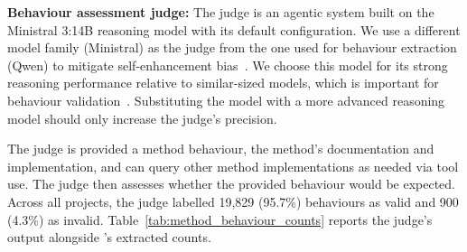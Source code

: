 

\smallskip
\noindent\textbf{Behaviour assessment judge:} The judge is an agentic system built on the Ministral 3:14B reasoning model with its default configuration. We use a different model family (Ministral) as the judge from the one used for behaviour extraction (Qwen) to mitigate self-enhancement bias~\cite{zheng2023judging}.
We choose this model for its strong reasoning performance relative to similar-sized models, which is important for behaviour validation~\cite{liu2026ministral}. 
Substituting the model with a more advanced reasoning model should only increase the judge's precision. 

The judge is provided a method behaviour, the method's documentation and implementation, and can query other method implementations as needed via tool use. 
The judge then assesses whether the provided behaviour would be expected. 
Across all projects, the judge labelled 19,829 (95.7\%) behaviours as valid and 900 (4.3\%) as invalid.
Table~\ref{tab:method_behaviour_counts} reports the judge's output alongside \toolname{}'s extracted counts. %




